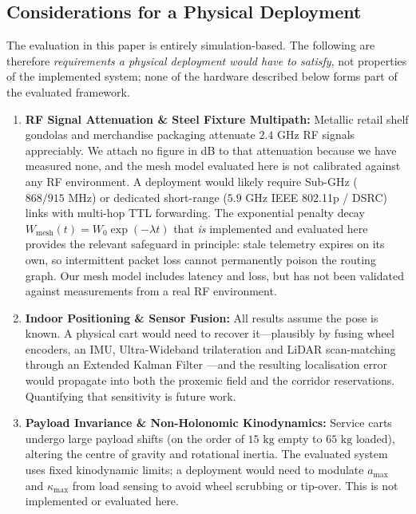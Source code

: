 \documentclass[journal]{IEEEtran}
\begin{document}
\subsection{Considerations for a Physical Deployment}
The evaluation in this paper is entirely simulation-based. The following are therefore \emph{requirements a physical deployment would have to satisfy}, not properties of the implemented system; none of the hardware described below forms part of the evaluated framework.

\begin{enumerate}
    \item \textbf{RF Signal Attenuation \& Steel Fixture Multipath:} Metallic retail shelf gondolas and merchandise packaging attenuate $2.4\text{ GHz}$ RF signals appreciably. We attach no figure in dB to that attenuation because we have measured none, and the mesh model evaluated here is not calibrated against any RF environment. A deployment would likely require Sub-GHz ($868/915\text{ MHz}$) or dedicated short-range ($5.9\text{ GHz}$ IEEE 802.11p / DSRC) links with multi-hop TTL forwarding. The exponential penalty decay $W_{\text{mesh}}(t) = W_0 \exp(-\lambda t)$ that \emph{is} implemented and evaluated here provides the relevant safeguard in principle: stale telemetry expires on its own, so intermittent packet loss cannot permanently poison the routing graph. Our mesh model includes latency and loss, but has not been validated against measurements from a real RF environment.
    \item \textbf{Indoor Positioning \& Sensor Fusion:} All results assume the pose is known. A physical cart would need to recover it---plausibly by fusing wheel encoders, an IMU, Ultra-Wideband trilateration and LiDAR scan-matching through an Extended Kalman Filter \cite{nugraha2024ips, zafari2019survey}---and the resulting localisation error would propagate into both the proxemic field and the corridor reservations. Quantifying that sensitivity is future work.
    \item \textbf{Payload Invariance \& Non-Holonomic Kinodynamics:} Service carts undergo large payload shifts (on the order of $15\text{ kg}$ empty to $65\text{ kg}$ loaded), altering the centre of gravity and rotational inertia. The evaluated system uses fixed kinodynamic limits; a deployment would need to modulate $a_{\max}$ and $\kappa_{\max}$ from load sensing to avoid wheel scrubbing or tip-over. This is not implemented or evaluated here.
\end{enumerate}
\end{document}
